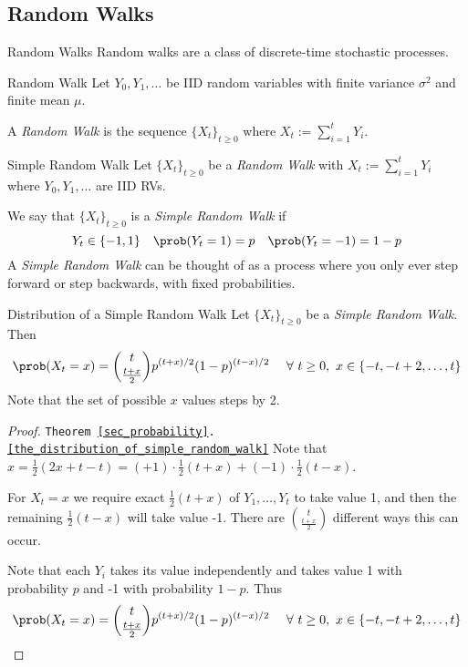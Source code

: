 \documentclass[11pt,a4paper]{article}
\begin{document}
\subsection{Random Walks}

  \begin{remark}{Random Walks}
    Random walks are a class of discrete-time stochastic processes.
  \end{remark}

  \begin{definition}{Random Walk}
    Let $Y_0,Y_1,\dots$ be IID random variables with finite variance $\sigma^2$ and finite mean $\mu$.
    \par A \textit{Random Walk} is the sequence $\{X_t\}_{t\geq0}$ where $X_t:=\sum_{i=1}^tY_i$.
  \end{definition}

  \begin{definition}{Simple Random Walk}
    Let $\{X_t\}_{t\geq0}$ be a \textit{Random Walk} with $X_t:=\sum_{i=1}^tY_i$ where $Y_0,Y_1,\dots$ are IID RVs.
    \par We say that $\{X_t\}_{t\geq0}$ is a \textit{Simple Random Walk} if
    \[ Y_t\in\{-1,1\}\quad\prob(Y_t=1)=p\quad\prob(Y_t=-1)=1-p \]
    A \textit{Simple Random Walk} can be thought of as a process where you only ever step forward or step backwards, with fixed probabilities.
  \end{definition}

  \begin{theorem}{Distribution of a Simple Random Walk}\label{the_distribution_of_simple_random_walk}
    Let $\{X_t\}_{t\geq0}$ be a \textit{Simple Random Walk}. Then
    \[ \prob(X_t=x)={t \choose {\frac{t+x}2}}p^{(t+x)/2}(1-p)^{(t-x)/2}\quad\ \forall\ t\geq0,\ x\in\{-t,-t+2,\dots,t\} \]
    Note that the set of possible $x$ values steps by 2.
  \end{theorem}

  \begin{proof}{\texttt{Theorem \ref{sec_probability}.\ref{the_distribution_of_simple_random_walk}}}
    Note that $x=\frac12(2x+t-t)=(+1)\cdot\frac12(t+x)+(-1)\cdot\frac12(t-x)$.
    \par For $X_t=x$ we require exact $\frac12(t+x)$ of $Y_1,\dots,Y_t$ to take value 1, and then the remaining $\frac12(t-x)$ will take value -1. There are ${t\choose{\frac{t+x}2}}$ different ways this can occur.
    \par Note that each $Y_i$ takes its value independently and takes value 1 with probability $p$ and -1 with probability $1-p$. Thus
    \[ \prob(X_t=x)={t \choose {\frac{t+x}2}}p^{(t+x)/2}(1-p)^{(t-x)/2}\quad\ \forall\ t\geq0,\ x\in\{-t,-t+2,\dots,t\} \]
  \end{proof}
\end{document}

